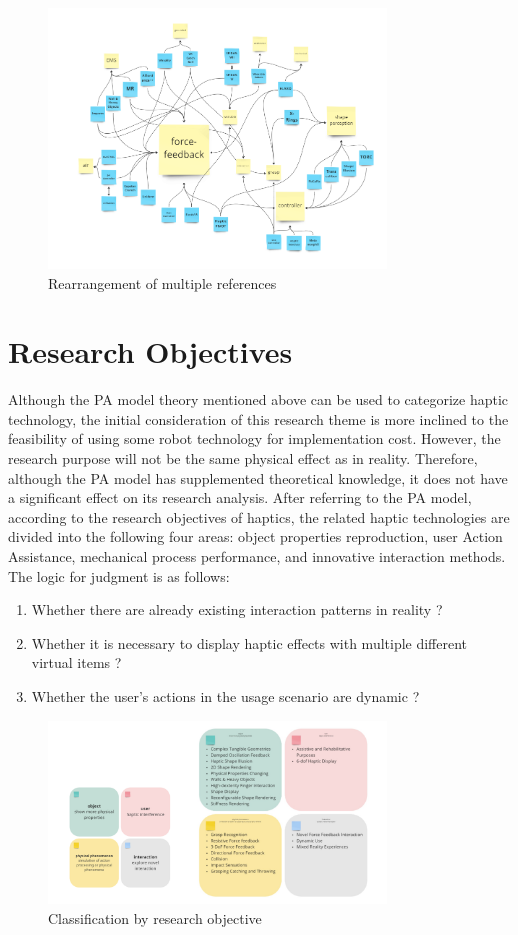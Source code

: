 \begin{figure}[h]
\centering
\includegraphics[width=0.8\textwidth]{A_thesis/figures/002.png}
\caption{Rearrangement of multiple references}
\end{figure}


\section{Research Objectives}
Although the PA model theory mentioned above can be used to categorize haptic technology, the initial consideration of this research theme is more inclined to the feasibility of using some robot technology for implementation cost. However, the research purpose will not be the same physical effect as in reality. Therefore, although the PA model has supplemented theoretical knowledge, it does not have a significant effect on its research analysis. After referring to the PA model, according to the research objectives of haptics, the related haptic technologies are divided into the following four areas: object properties reproduction, user Action Assistance, mechanical process performance, and innovative interaction methods. The logic for judgment is as follows:
\begin{enumerate}
    \item Whether there are already existing interaction patterns in reality ?
    \item Whether it is necessary to display haptic effects with multiple different virtual items ?
    \item Whether the user's actions in the usage scenario are dynamic ?
\end{enumerate}

\begin{figure}[h]
\centering
\includegraphics[width=0.8\textwidth]{A_thesis/figures/003.png}
\caption{Classification by research objective}
\end{figure}

